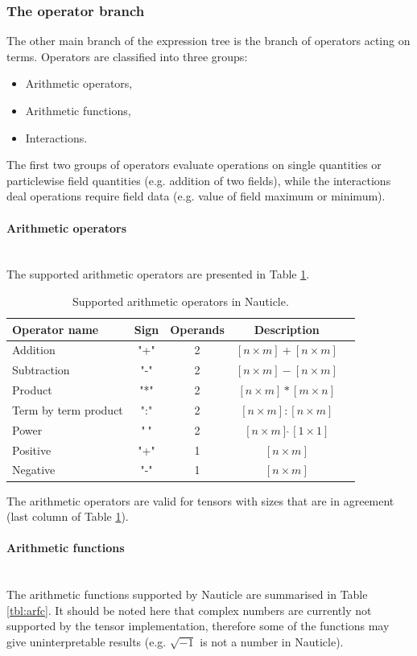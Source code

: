 \documentclass[a4paper,12pt,openany]{book}
\newcommand{\myparagraph}[1]{\paragraph{#1}\mbox{}\\}
\theoremstyle{break}
\begin{document}
\subsubsection{The operator branch}
The other main branch of the expression tree is the branch of operators acting on terms. Operators are classified into three groups:
\begin{itemize}
  \item Arithmetic operators,
  \item Arithmetic functions,
  \item Interactions.
\end{itemize}
The first two groups of operators evaluate operations on single quantities or particlewise field quantities (e.g. addition of two fields), while the interactions deal operations require field data (e.g. value of field maximum or minimum).
\myparagraph{Arithmetic operators}
The supported arithmetic operators are presented in Table \ref{tbl:arop}.
\begin{table}
\begin{center}
\caption{Supported arithmetic operators in Nauticle.}\label{tbl:arop}
\begin{tabular}{ l c c c c }
\toprule[1.5pt]
\bf Operator name & \bf Sign & \bf Operands & \bf Description\\ 
\midrule
Addition & "+" & 2 & $[n \times m] + [n \times m]$\\ 
Subtraction & "-" & 2 & $[n \times m] - [n \times m]$\\ 
Product & "*" & 2 & $[n \times m] * [m \times n]$\\ 
Term by term product & ":" & 2 & $[n \times m] : [n \times m]$\\ 
Power & "$\hat{\ }$" & 2 & $[n \times m] \hat{\ } [1 \times 1]$\\ 
Positive & "+" & 1 & $[n \times m]$\\ 
Negative & "-" & 1 & $[n \times m]$\\ 
\bottomrule[1.25pt]
\end{tabular}
\end{center}
\end{table}
The arithmetic operators are valid for tensors with sizes that are in agreement (last column of Table \ref{tbl:arop}).
\myparagraph{Arithmetic functions}
The arithmetic functions supported by Nauticle are summarised in Table \ref{tbl:arfc}. It should be noted here that complex numbers are currently not supported by the tensor implementation, therefore some of the functions may give uninterpretable results (e.g. $\sqrt{-1}$ is not a number in Nauticle).
\end{document}
